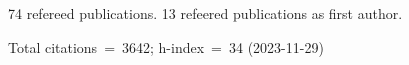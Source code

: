 74 refereed publications. 13 refeered publications as first author.

Total citations~=~3642; h-index~=~34 (2023-11-29)